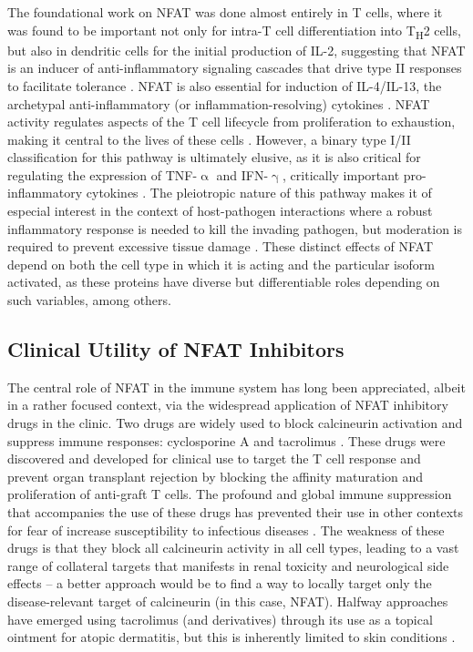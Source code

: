 The foundational work on NFAT was done almost entirely in T cells, where it was found to be important not only for intra\hyp{}T cell differentiation into T\textsubscript{H}2 cells, but also in dendritic cells for the initial production of IL\hyp{}2, suggesting that NFAT is an inducer of anti\hyp{}inflammatory signaling cascades that drive type II responses to facilitate tolerance \citep{Granucci2001, Granucci2003, Malek2004}. NFAT is also essential for induction of IL\hyp{}4/IL\hyp{}13, the archetypal anti\hyp{}inflammatory (or inflammation\hyp{}resolving) cytokines \citep{Monticelli2004, Agarwal2000, Monticelli2002, Wierenga2000}. NFAT activity regulates aspects of the T cell lifecycle from proliferation to exhaustion, making it central to the lives of these cells \citep{Crabtree2002, Martinez2015, Malek2004, Ranger1998a, YahiaCherbal2019}. However, a binary type I/II classification for this pathway is ultimately elusive, as it is also critical for regulating the expression of TNF\hyp{}$\upalpha$ and IFN\hyp{}$\upgamma$, critically important pro\hyp{}inflammatory cytokines \citep{Kiani2001, Sica1997, Kaminuma2008, Ke2006, Fric2012a, Nathan1983}. The pleiotropic nature of this pathway makes it of especial interest in the context of host\hyp{}pathogen interactions where a robust inflammatory response is needed to kill the invading pathogen, but moderation is required to prevent excessive tissue damage \citep{Casadevall2003}. These distinct effects of NFAT depend on both the cell type in which it is acting and the particular isoform activated, as these proteins have diverse but differentiable roles depending on such variables, among others.

\subsection{Clinical Utility of NFAT Inhibitors}\label{tacrolimus}

The central role of NFAT in the immune system has long been appreciated, albeit in a rather focused context, via the widespread application of NFAT inhibitory drugs in the clinic. Two drugs are widely used to block calcineurin activation and suppress immune responses: cyclosporine A and tacrolimus \citep{Mihatsch1998}. These drugs were discovered and developed for clinical use to target the T cell response and prevent organ transplant rejection by blocking the affinity maturation and proliferation of anti\hyp{}graft T cells. The profound and global immune suppression that accompanies the use of these drugs has prevented their use in other contexts for fear of increase susceptibility to infectious diseases \citep{vanSandwijk2013}. The weakness of these drugs is that they block all calcineurin activity in all cell types, leading to a vast range of collateral targets that manifests in renal toxicity and neurological side effects -- a better approach would be to find a way to locally target only the disease\hyp{}relevant target of calcineurin (in this case, NFAT). Halfway approaches have emerged using tacrolimus (and derivatives) through its use as a topical ointment for atopic dermatitis, but this is inherently limited to skin conditions \citep{Cheer2001, AlDaraji2002, Gupta2002, Gutfreund2013}. 

